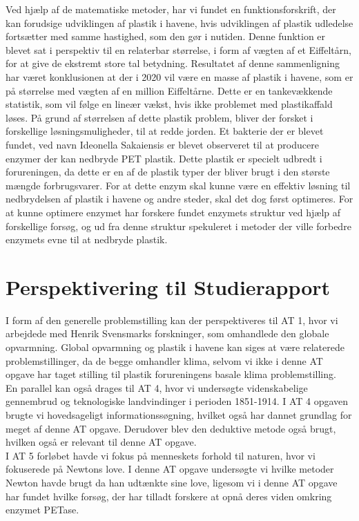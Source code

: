 \documentclass[12pt]{article}
\begin{document}
Ved hjælp af de matematiske metoder, har vi fundet en funktionsforskrift, der kan forudsige udviklingen af plastik i havene, hvis udviklingen af plastik udledelse fortsætter med samme hastighed, som den gør i nutiden. Denne funktion er blevet sat i perspektiv til en relaterbar størrelse, i form af vægten af et Eiffeltårn, for at give de ekstremt store tal betydning. Resultatet af denne sammenligning har været konklusionen at der i 2020 vil være en masse af plastik i havene, som er på størrelse med vægten af en million Eiffeltårne. Dette er en tankevækkende statistik, som vil følge en lineær vækst, hvis ikke problemet med plastikaffald løses.
På grund af størrelsen af dette plastik problem, bliver der forsket i forskellige løsningsmuligheder, til at redde jorden. Et bakterie der er blevet fundet, ved navn Ideonella Sakaiensis er blevet observeret til at producere enzymer der kan nedbryde PET plastik. Dette plastik er specielt udbredt i forureningen, da dette er en af de plastik typer der bliver brugt i den største mængde forbrugsvarer.
For at dette enzym skal kunne være en effektiv løsning til nedbrydelsen af plastik i havene og andre steder, skal det dog først optimeres. For at kunne optimere enzymet har forskere fundet enzymets struktur ved hjælp af forskellige forsøg, og ud fra denne struktur spekuleret i metoder der ville forbedre enzymets evne til at nedbryde plastik.

\section*{Perspektivering til Studierapport}

I form af den generelle problemstilling kan der perspektiveres til AT 1, hvor vi arbejdede med Henrik Svensmarks forskninger, som omhandlede den globale opvarmning. Global opvarmning og plastik i havene kan siges at være relaterede problemstillinger, da de begge omhandler klima, selvom vi ikke i denne AT opgave har taget stilling til plastik forureningens basale klima problemstilling.\\
En parallel kan også drages til AT 4,  hvor vi undersøgte videnskabelige gennembrud og teknologiske landvindinger i perioden 1851-1914. I AT 4 opgaven brugte vi hovedsageligt informationssøgning, hvilket også har dannet grundlag for meget af denne AT opgave. Derudover blev den deduktive metode også brugt, hvilken også er relevant til denne AT opgave.\\
I AT 5 forløbet havde vi fokus på menneskets forhold til naturen, hvor vi fokuserede på Newtons love. I denne AT opgave undersøgte vi hvilke metoder Newton havde brugt da han udtænkte sine love, ligesom vi i denne AT opgave har fundet hvilke forsøg, der har tilladt forskere at opnå deres viden omkring enzymet PETase.
\end{document}
